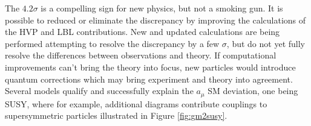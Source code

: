 
The $4.2\sigma$  is a compelling sign for new physics, but not a smoking gun. It is possible to reduced or eliminate the discrepancy by improving the calculations of the HVP and LBL contributions. New and updated calculations are being performed attempting to resolve the discrepancy by a few $\sigma$, but do not yet fully resolve the differences between observations and theory. If computational improvements can't bring the theory into focus, new particles would introduce  quantum corrections which may bring experiment and theory into agreement. Several models qualify and successfully explain the $a_\mu$ SM deviation, one being SUSY, where for example, additional diagrams contribute couplings to supersymmetric particles illustrated in Figure \ref{fig:gm2susy}.

